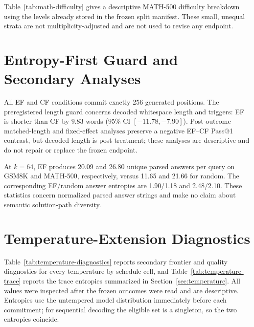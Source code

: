 \documentclass[11pt]{article}
\newcommand{\cauc}{\operatorname{CoverageAUC}}
\newcommand{\gsm}{GSM8K}
\newcommand{\mathfive}{MATH-500}
\begin{document}
Table~\ref{tab:math-difficulty} gives a descriptive MATH-500 difficulty breakdown using the levels already stored in the frozen split manifest. These small, unequal strata are not multiplicity-adjusted and are not used to revise any endpoint.

\begin{table}[h]
\caption{MATH-500 $\cauc_{\{4,8,16,32,64\}}$ by frozen difficulty level. Values are post-outcome descriptive estimates.}
\label{tab:math-difficulty}
\centering
\small
{}
\end{table}

\section{Entropy-First Guard and Secondary Analyses}

All EF and CF conditions commit exactly 256 generated positions. The preregistered length guard concerns decoded whitespace length and triggers: EF is shorter than CF by $9.83$ words (95\% CI $[-11.78,-7.90]$). Post-outcome matched-length and fixed-effect analyses preserve a negative EF--CF Pass@1 contrast, but decoded length is post-treatment; these analyses are descriptive and do not repair or replace the frozen endpoint.

At $k=64$, EF produces 20.09 and 26.80 unique parsed answers per query on \gsm{} and \mathfive{}, respectively, versus 11.65 and 21.66 for random. The corresponding EF/random answer entropies are 1.90/1.18 and 2.48/2.10. These statistics concern normalized parsed answer strings and make no claim about semantic solution-path diversity.

\section{Temperature-Extension Diagnostics}
\label{app:temperature}

Table~\ref{tab:temperature-diagnostics} reports secondary frontier and quality diagnostics for every temperature-by-schedule cell, and Table~\ref{tab:temperature-trace} reports the trace entropies summarized in Section~\ref{sec:temperature}. All values were inspected after the frozen outcomes were read and are descriptive. Entropies use the untempered model distribution immediately before each commitment; for sequential decoding the eligible set is a singleton, so the two entropies coincide.
\end{document}
